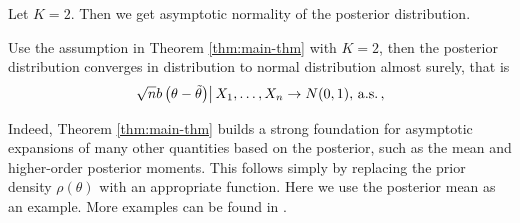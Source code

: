 Let $K=2$. Then we get asymptotic normality of the posterior distribution. 
\begin{corollary}
Use the assumption in Theorem \ref{thm:main-thm} with $K=2$, then
the posterior distribution converges in distribution to normal distribution
almost surely, that is 
\[
\left.\sqrt{n}b\left(\theta-\tilde{\theta}\right)\right|X_{1},\ldots,X_{n}\rightarrow N(0,1),\,\mathrm{a.s.}\,,
\]

\end{corollary}
Indeed, Theorem \ref{thm:main-thm} builds a strong foundation for 
asymptotic expansions of many other quantities based on the posterior,
such as the mean and higher-order posterior moments. This follows simply by replacing the prior density $\rho\left(\theta\right)$ with an
appropriate function. Here we use the posterior mean as an example. More
examples can be  found in \cite{johnson1970asymptotic}.
